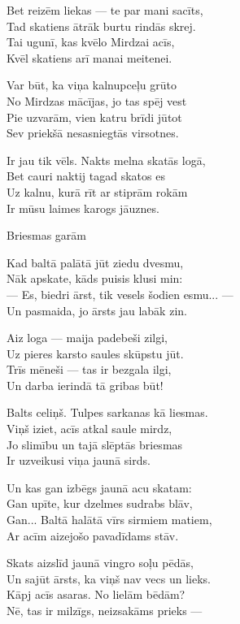 \documentclass[14pt]{extarticle}
\begin{document}
{{Bet reizēm liekas --- te par mani sacīts,\\
Tad skatiens ātrāk burtu rindās skrej.\\
Tai ugunī, kas kvēlo Mirdzai acīs,\\
Kvēl skatiens arī manai meitenei.

Var būt, ka viņa kalnupceļu grūto\\
No Mirdzas mācījas, jo tas spēj vest\\
Pie uzvarām, vien katru brīdi jūtot\\
Sev priekšā nesasniegtās virsotnes.

Ir jau tik vēls. Nakts melna skatās logā,\\
Bet cauri naktij tagad skatos es\\
Uz kalnu, kurā rīt ar stiprām rokām\\
Ir mūsu laimes karogs jāuznes.

\newpage

{\large \sc Briesmas garām}

Kad baltā palātā jūt ziedu dvesmu,\\
Nāk apskate, kāds puisis klusi min:\\
--- Es, biedri ārst, tik vesels šodien esmu... ---\\
Un pasmaida, jo ārsts jau labāk zin.

Aiz loga --- maija padebeši zilgi,\\
Uz pieres karsto saules skūpstu jūt.\\
Trīs mēneši --- tas ir bezgala ilgi,\\
Un darba ierindā tā gribas būt!

Balts celiņš. Tulpes sarkanas kā liesmas.\\
Viņš iziet, acīs atkal saule mirdz,\\
Jo slimību un tajā slēptās briesmas\\
Ir uzveikusi viņa jaunā sirds.

Un kas gan izbēgs jaunā acu skatam:\\
Gan upīte, kur dzelmes sudrabs blāv,\\
Gan... Baltā halātā vīrs sirmiem matiem,\\
Ar acīm aizejošo pavadīdams stāv.

Skats aizslīd jaunā vingro soļu pēdās,\\
Un sajūt ārsts, ka viņš nav vecs un lieks.\\
Kāpj acīs asaras. No lielām bēdām?\\
Nē, tas ir milzīgs, neizsakāms prieks ---

}}
\end{document}
